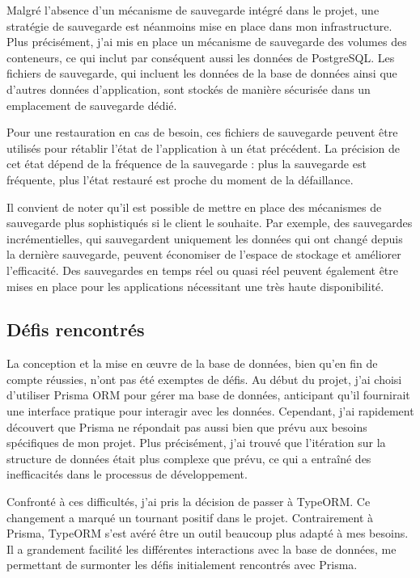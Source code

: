 Malgré l'absence d'un mécanisme de sauvegarde intégré dans le projet, une stratégie de sauvegarde est néanmoins mise en place dans mon infrastructure.
Plus précisément, j'ai mis en place un mécanisme de sauvegarde des volumes des conteneurs, ce qui inclut par conséquent aussi les données de PostgreSQL.
Les fichiers de sauvegarde, qui incluent les données de la base de données ainsi que d'autres données d'application, sont stockés de manière sécurisée dans un emplacement de sauvegarde dédié.

Pour une restauration en cas de besoin, ces fichiers de sauvegarde peuvent être utilisés pour rétablir l'état de l'application à un état précédent.
La précision de cet état dépend de la fréquence de la sauvegarde : plus la sauvegarde est fréquente, plus l'état restauré est proche du moment de la défaillance.

Il convient de noter qu'il est possible de mettre en place des mécanismes de sauvegarde plus sophistiqués si le client le souhaite.
Par exemple, des sauvegardes incrémentielles, qui sauvegardent uniquement les données qui ont changé depuis la dernière sauvegarde, peuvent économiser de l'espace de stockage et améliorer l'efficacité.
Des sauvegardes en temps réel ou quasi réel peuvent également être mises en place pour les applications nécessitant une très haute disponibilité.

\subsection{Défis rencontrés}\label{subsec:challenges}
La conception et la mise en œuvre de la base de données, bien qu'en fin de compte réussies, n'ont pas été exemptes de défis.
Au début du projet, j'ai choisi d'utiliser Prisma ORM pour gérer ma base de données, anticipant qu'il fournirait une interface pratique pour interagir avec les données.
Cependant, j'ai rapidement découvert que Prisma ne répondait pas aussi bien que prévu aux besoins spécifiques de mon projet.
Plus précisément, j'ai trouvé que l'itération sur la structure de données était plus complexe que prévu, ce qui a entraîné des inefficacités dans le processus de développement.

Confronté à ces difficultés, j'ai pris la décision de passer à TypeORM. Ce changement a marqué un tournant positif dans le projet.
Contrairement à Prisma, TypeORM s'est avéré être un outil beaucoup plus adapté à mes besoins.
Il a grandement facilité les différentes interactions avec la base de données, me permettant de surmonter les défis initialement rencontrés avec Prisma.

